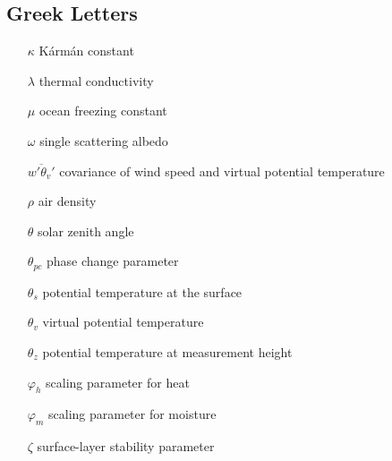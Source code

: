 \subsection{Greek Letters}
\begin{enumerate}
    \item[$\kappa$]	K\'{a}rm\'{a}n constant
    \item[$\lambda$] thermal conductivity
    \item[$\mu$] ocean freezing constant
    \item[$\omega$] single scattering albedo
    \item[$\overbar{w'\theta_{v}'}$] covariance of wind speed and virtual potential temperature
    \item[$\rho$] air density
    \item[$\theta$] solar zenith angle
    \item[$\theta_{pc}$] phase change parameter
    \item[$\theta_{s}$] potential temperature at the surface
    \item[$\theta_{v}$] virtual potential temperature
    \item[$\theta_{z}$] potential temperature at measurement height
    \item[$\varphi_{h}$] scaling parameter for heat
    \item[$\varphi_{m}$] scaling parameter for moisture
    \item[$\zeta$] surface-layer stability parameter
\end{enumerate}
